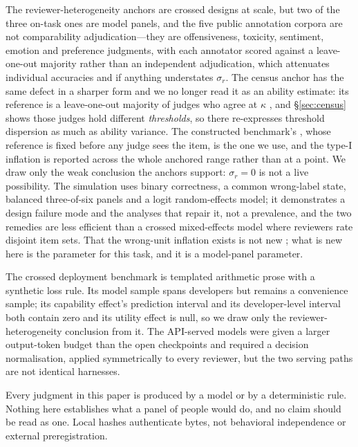 \documentclass[11pt]{article}
\begin{document}
The reviewer-heterogeneity anchors are crossed designs at scale, but two of the
three on-task ones are model panels, and the five public annotation corpora are
not comparability adjudication---they are offensiveness, toxicity, sentiment,
emotion and preference judgments, with each annotator scored against a
leave-one-out majority rather than an independent adjudication, which attenuates
individual accuracies and if anything understates $\sigma_r$. The census anchor
has the same defect in a sharper form and we no longer read it as an ability
estimate: its reference is a leave-one-out majority of judges who agree at
$\kappa$ \DecVerdictK{}, and \S\ref{sec:census} shows those judges hold
different \emph{thresholds}, so \SigCensusVal{} there re-expresses threshold
dispersion as much as ability variance. The constructed benchmark's
\SigInsVal{} \SigInsCI{}, whose reference is fixed before any judge sees the
item, is the one we use, and the type-I inflation is reported across the whole
anchored range rather than at a point. We draw only the weak conclusion the
anchors support: $\sigma_r=0$ is not a live possibility. The simulation uses
binary correctness, a common wrong-label state, balanced three-of-six panels and
a logit random-effects model; it demonstrates a design failure mode and the
analyses that repair it, not a prevalence, and the two remedies are less
efficient than a crossed mixed-effects model where reviewers rate disjoint item
sets. That the wrong-unit inflation exists is not new
\citep{clark1973language,judd2012stimuli}; what is new here is the parameter for
this task, and it is a model-panel parameter.

The crossed deployment benchmark is templated arithmetic prose with a synthetic
loss rule. Its model sample spans \CMJdevelopers{} developers but remains a
convenience sample; its capability effect's prediction interval and its
developer-level interval both contain zero and its utility effect is null, so we
draw only the reviewer-heterogeneity conclusion from it. The API-served models
were given a larger output-token budget than the open checkpoints and required a
decision normalisation, applied symmetrically to every reviewer, but the two
serving paths are not identical harnesses.

Every judgment in this paper is produced by a model or by a deterministic rule.
Nothing here establishes what a panel of people would do, and no claim should be
read as one. Local hashes authenticate bytes, not behavioral independence or
external preregistration.
\end{document}
